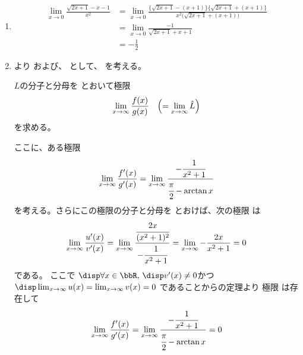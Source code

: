 \begin{ans*}
  ${}$
  \begin{enumerate}[label=(\arabic*)]
    \item
    \begin{align}
      \lim_{x\to 0}\frac{\sqrt{2x+1} - x - 1}{x^2}
      &= \lim_{x\to 0}\frac{\bigl\{ \sqrt{2x+1} - (x+1) \bigr\}\bigl\{ \sqrt{2x+1} + (x+1) \bigr\}}{x^2\bigl( \sqrt{2x+1} + (x+1) \bigr)} \\
      &= \lim_{x\to 0}\frac{-1}{\sqrt{2x+1} + x + 1} \\
      &= - \frac{1}{2}
    \end{align}

    \item
    より
    および、
    として、
    を考える。

    $L$の分子と分母を
    とおいて極限
    \begin{gather}
      \lim_{x\to\infty}\frac{f(x)}{g(x)} \quad\Bigl(= \lim_{x\to\infty} \hat{L}\Bigr)
    \end{gather}
    を求める。

    ここに、ある極限
    \begin{gather}
      \lim_{x\to\infty}\frac{f'(x)}{g'(x)}
      =\lim_{x\to\infty}\frac{-\cfrac{1}{x^2+1}}{\cfrac{\pi}{2}-\arctan x}
    \end{gather}
    を考える。さらにこの極限の分子と分母を
    とおけば、次の極限
    は
    \begin{align}
      \lim_{x\to\infty}\frac{u'(x)}{v'(x)}
      = \lim_{x\to\infty} \frac{\cfrac{2x}{(x^2+1)^2}}{-\cfrac{1}{x^2+1}}
      = \lim_{x\to\infty} -\frac{2x}{x^2+1}
      = 0
    \end{align}
    である。
    ここで
    $\disp\forall x\in\bbR,\,\disp v'(x)\neq 0$かつ$\disp \lim_{x\to\infty}u(x) = \lim_{x\to\infty}v(x) = 0$
    であることから\lhopital の定理より
    極限
    は存在して
    \begin{gather}
      \lim_{x\to\infty}\frac{f'(x)}{g'(x)}
      = \lim_{x\to\infty}\frac{-\cfrac{1}{x^2+1}}{\cfrac{\pi}{2}-\arctan x}
      = 0
    \end{gather}


\end{enumerate}
\end{ans*}
